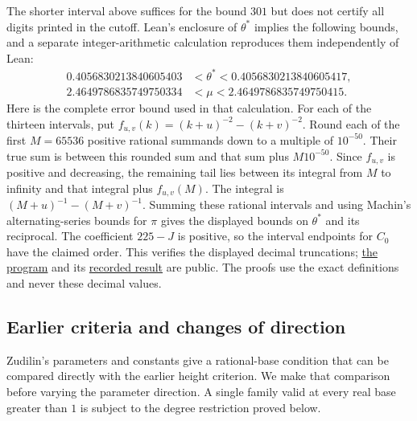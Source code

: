 \documentclass[11pt]{article}
\begin{document}
The shorter interval above suffices for the bound $301$ but does not
certify all digits printed in the cutoff. Lean's enclosure of $\theta^*$
implies the following bounds, and a separate integer-arithmetic
calculation reproduces them independently of Lean:
\[
\begin{aligned}
0.4056830213840605403&<\theta^*<0.4056830213840605417,\\
2.4649786835749750334&<\mu<2.4649786835749750415.
\end{aligned}
\]
Here is the complete error bound used in that calculation. For each of the thirteen
intervals, put $f_{u,v}(k)=(k+u)^{-2}-(k+v)^{-2}$.
Round each of the first $M=65536$ positive rational summands down to a
multiple of $10^{-50}$. Their true sum is between this rounded sum and
that sum plus $M10^{-50}$. Since $f_{u,v}$ is positive and decreasing,
the remaining tail lies between its integral from $M$ to infinity
and that integral plus $f_{u,v}(M)$. The integral is
$(M+u)^{-1}-(M+v)^{-1}$. Summing these rational intervals and using
Machin's alternating-series bounds for $\pi$ gives the displayed
bounds on $\theta^*$ and its reciprocal. The coefficient
$225-J$ is positive, so the interval endpoints for $C_0$ have the
claimed order. This verifies the displayed decimal truncations; \href{https://github.com/wcook04/plectis-erdos/blob/4beca4ad0c00a626def9c73f2420e20ebf8d1968/research/experiments/erdos1049/threshold_digits.py}{the program} and
its \href{https://github.com/wcook04/plectis-erdos/blob/4beca4ad0c00a626def9c73f2420e20ebf8d1968/research/experiments/erdos1049/receipts/threshold-digits.json}{recorded result} are public. The proofs use the exact definitions and never these decimal values.

\subsection{Earlier criteria and changes of direction}\label{long1049:sec:region-extensions}

Zudilin's parameters and constants give a rational-base condition
that can be compared directly with the earlier height criterion.
We make that comparison before varying the parameter direction.
A single family valid at every real base greater than $1$ is subject
to the degree restriction proved below.
\end{document}
